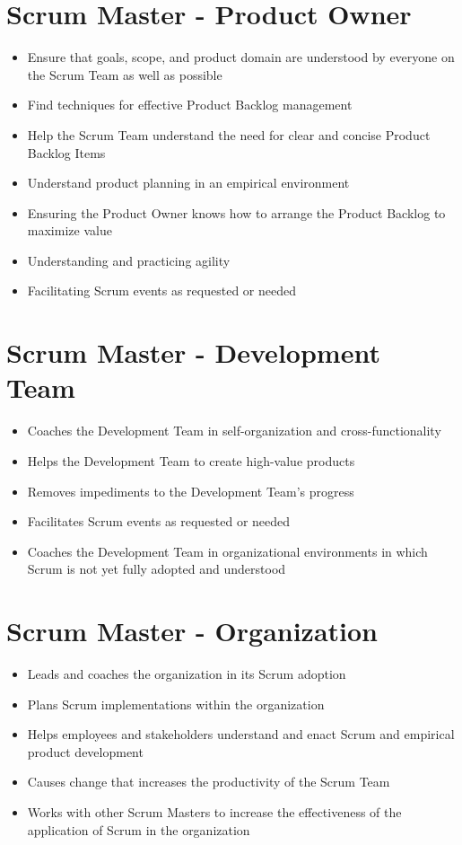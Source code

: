 \documentclass[a4paper,11pt,twocolumn]{article}
\begin{document}
\section*{Scrum Master - Product Owner}
\begin{itemize}
    \item Ensure that goals, scope, and product domain are understood by everyone on the Scrum Team as well as possible
    \item Find techniques for effective Product Backlog management
    \item Help the Scrum Team understand the need for clear and concise Product Backlog Items
    \item Understand product planning in an empirical environment
    \item Ensuring the Product Owner knows how to arrange the Product Backlog to maximize value
    \item Understanding and practicing agility
    \item Facilitating Scrum events as requested or needed
\end{itemize}

\section*{Scrum Master - Development Team}
\begin{itemize}
    \item Coaches the Development Team in self-organization and cross-functionality
    \item Helps the Development Team to create high-value products
    \item Removes impediments to the Development Team's progress
    \item Facilitates Scrum events as requested or needed
    \item Coaches the Development Team in organizational environments in which Scrum is not yet fully adopted and understood
\end{itemize}

\section*{Scrum Master - Organization}
\begin{itemize}
    \item Leads and coaches the organization in its Scrum adoption
    \item Plans Scrum implementations within the organization
    \item Helps employees and stakeholders understand and enact Scrum and empirical product development
    \item Causes change that increases the productivity of the Scrum Team
    \item Works with other Scrum Masters to increase the effectiveness of the application of Scrum in the organization
\end{itemize}
\end{document}
